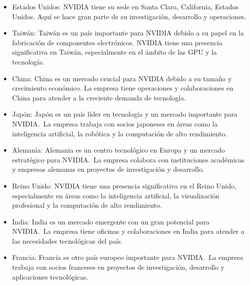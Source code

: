 \documentclass[letterpaper, 12pt]{article}
\begin{document}
\begin{itemize}
      \item Estados Unidos:
            NVIDIA tiene su sede en Santa Clara, California,
            Estados Unidos. Aquí se hace gran parte de su investigación,
            desarrollo y operaciones.

      \item Taiwán:
            Taiwán es un país importante para NVIDIA debido a su
            papel en la fabricación de componentes electrónicos.
            NVIDIA tiene una presencia significativa en Taiwán,
            especialmente en el ámbito de las GPU y la tecnología.

      \item China:
            China es un mercado crucial para NVIDIA debido a su
            tamaño y crecimiento económico. La empresa tiene
            operaciones y colaboraciones en China para atender a
            la creciente demanda de tecnología.

      \item Japón:
            Japón es un país líder en tecnología y un mercado
            importante para NVIDIA.~La empresa trabaja con socios
            japoneses en áreas como la inteligencia artificial,
            la robótica y la computación de alto rendimiento.

      \item Alemania:
            Alemania es un centro tecnológico en Europa y un
            mercado estratégico para NVIDIA.~La empresa colabora
            con instituciones académicas y empresas alemanas en
            proyectos de investigación y desarrollo.

      \item Reino Unido:
            NVIDIA tiene una presencia significativa en el Reino
            Unido, especialmente en áreas como la inteligencia
            artificial, la visualización profesional y la computación
            de alto rendimiento.

      \item India:
            India es un mercado emergente con un gran potencial
            para NVIDIA.~La empresa tiene oficinas y colaboraciones
            en India para atender a las necesidades tecnológicas del país.

      \item Francia:
            Francia es otro país europeo importante para NVIDIA.~La
            empresa trabaja con socios franceses en proyectos
            de investigación, desarrollo y aplicaciones tecnológicas.

\end{itemize}
\end{document}
